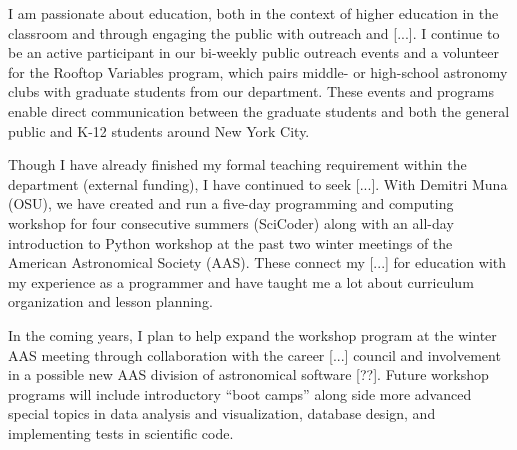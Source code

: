 \documentclass[letterpaper,12pt,preprint]{aastex}
\begin{document}
I am passionate about education, both in the context of higher education in the classroom and through engaging the public with outreach and [...]. I continue to be an active participant in our bi-weekly public outreach events and a volunteer for the Rooftop Variables program, which pairs middle- or high-school astronomy clubs with graduate students from our department. These events and programs enable direct communication between the graduate students and both the general public and K-12 students around New York City. 

Though I have already finished my formal teaching requirement within the department (external funding), I have continued to seek [...]. With Demitri Muna (OSU), we have created and run a five-day programming and computing workshop for four consecutive summers (SciCoder) along with an all-day introduction to Python workshop at the past two winter meetings of the American Astronomical Society (AAS). These connect my [...] for education with my experience as a programmer and have taught me a lot about curriculum organization and lesson planning.

In the coming years, I plan to help expand the workshop program at the winter AAS meeting through collaboration with the career [...] council and involvement in a possible new AAS division of astronomical software [??]. Future workshop programs will include introductory ``boot camps'' along side more advanced special topics in data analysis and visualization, database design, and implementing tests in scientific code.




\end{document}
